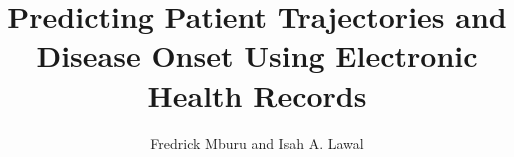\documentclass[manuscript,screen,]{acmart}
\begin{document}
\title{Predicting Patient Trajectories and Disease Onset Using Electronic Health Records}

\author{Fredrick Mburu and Isah A. Lawal}


\renewcommand{\shortauthors}{Fredrick Mburu and IA Lawal}

\end{document}
